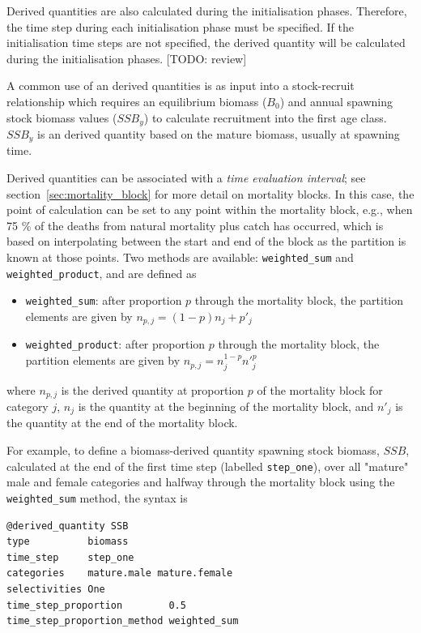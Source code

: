 Derived quantities are also calculated during the initialisation phases. Therefore, the time step during each initialisation phase must be specified. If the initialisation time steps are not specified, the derived quantity will be calculated during the initialisation phases. [TODO: review]

A common use of an derived quantities is as input into a stock-recruit relationship  which requires an equilibrium biomass ($B_0$) and annual spawning stock biomass values ($SSB_y$) to calculate recruitment into the first age class. $SSB_y$ is an derived quantity based on the mature biomass, usually at spawning time. 

Derived quantities can be associated with a \textit{time evaluation interval}; see section~\ref{sec:mortality_block} for more detail on mortality blocks. In this case, the point of calculation can be set to any point within the mortality block, e.g., when 75 \% of the deaths from natural mortality plus catch has occurred, which is based on interpolating between the start and end of the block as the partition is known at those points.  Two  methods are available: \texttt{weighted\_sum} and \texttt{weighted\_product}, and are defined as

\begin{itemize}
	\item \texttt{weighted\_sum}: after proportion $p$ through the mortality block, the partition elements are given by $n_{p,j} = (1 - p)n_j + p'_j$

	\item \texttt{weighted\_product}: after proportion $p$ through the mortality block, the partition elements are given by $n_{p,j} = n_j^{1-p} n'^p_j$
\end{itemize}

where $n_{p,j}$ is the derived quantity at proportion $p$ of the mortality block for category $j$, $n_j$ is the quantity at the beginning of the mortality block, and $n'_j$ is the quantity at the end of the mortality block.

For example, to define a biomass-derived quantity spawning stock biomass, $SSB$, calculated at the end of the first time step (labelled \texttt{step\_one}), over all "mature" male and female categories and halfway through the mortality block using the \texttt{weighted\_sum} method, the syntax is

{\small{\begin{verbatim}
@derived_quantity SSB
type          biomass
time_step     step_one
categories    mature.male mature.female
selectivities One
time_step_proportion        0.5
time_step_proportion_method weighted_sum
\end{verbatim}}}

